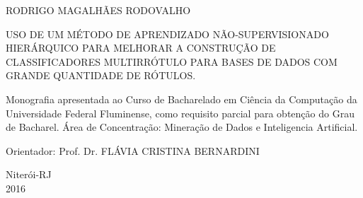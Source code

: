 

\begin{center}

RODRIGO MAGALHÃES RODOVALHO

\vfill

USO DE UM MÉTODO DE APRENDIZADO NÃO-SUPERVISIONADO HIERÁRQUICO PARA MELHORAR A CONSTRUÇÃO
DE CLASSIFICADORES MULTIRRÓTULO PARA BASES DE DADOS COM GRANDE QUANTIDADE DE RÓTULOS.

\vspace{3.0cm}

\begin{flushright}
\begin{minipage}{0.45\textwidth}

Monografia apresentada ao Curso de \linebreak Bacharelado em Ciência da Computação da \linebreak Universidade Federal Fluminense, como \linebreak requisito parcial para obtenção do Grau de Bacharel. Área de Concentração: Mineração de Dados e Inteligencia Artificial.

\end{minipage}
\end{flushright}

\vspace{3.0cm}

Orientador: Prof. Dr. FLÁVIA CRISTINA BERNARDINI

\vfill

Niterói-RJ\\2016

\end{center}

\newpage
